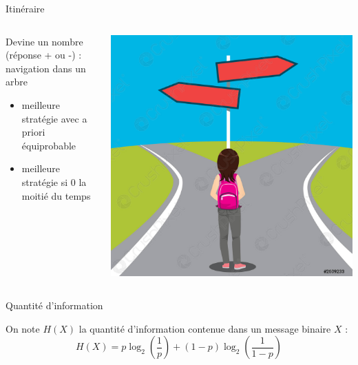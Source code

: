 \documentclass[9pt, aspectratio=169]{beamer}
\begin{document}
\begin{frame}{Itinéraire} %
\begin{columns}
   \begin{column}{0.6\textwidth}
        Devine un nombre (réponse + ou -) : navigation dans un arbre
	
        \begin{itemize}
        \item meilleure stratégie avec a priori équiprobable
	    \item meilleure stratégie si 0 la moitié du temps
        \end{itemize}
        
   \end{column}
   \begin{column}{0.39\textwidth}
		\includegraphics[width=\textwidth]{fig/choice_left_right.jpg}
   \end{column}
\end{columns}
\end{frame}

\begin{frame}{Quantité d'information} %

On note $H(X)$ la quantité d'information contenue dans un message binaire $X$ :
\begin{equation*}
    H(X) = p \log_2\left(\frac{1}{p}\right) + (1-p) \log_2\left(\frac{1}{1-p}\right)
\end{equation*}


\end{frame}
\end{document}
